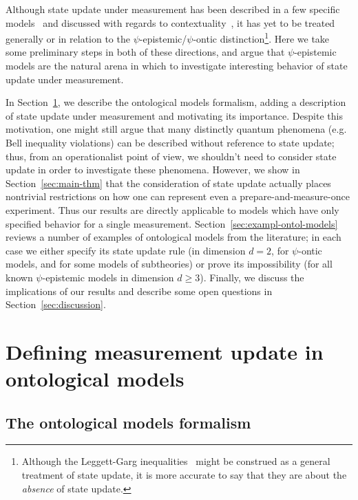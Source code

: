 \documentclass[%
 reprint, onecolumn, 12pt,
superscriptaddress,
nofootinbib,
 prx, 
]{quantumarticle}
\begin{document}
Although state update under measurement has been described in a few
specific
models~\cite{MontinaDynamicsqubitclassical2012,Spekkensdefenseepistemicview2007,CataniSpekkenstoymodel2017,LillystoneContextualpsEpistemicModel2019}
and discussed with regards to
contextuality~\cite{KaranjaiContextualityboundsefficiency2018}, it has
yet to be treated generally or in relation to the
$\psi$-epistemic/$\psi$-ontic distinction\footnote{Although the
  Leggett-Garg
  inequalities~\cite{LeggettQuantummechanicsmacroscopic1985,EmaryLeggettGargInequalities2014}
  might be construed as a general treatment of state update, it is
  more accurate to say that they are about the \emph{absence} of state
  update.}. Here we take some preliminary steps in both of these
directions, and argue that $\psi$-epistemic models are the natural
arena in which to investigate interesting behavior of state update
under measurement.


In Section~\ref{sec:defin-meas-update}, we describe the ontological
models formalism, adding a description of state update under
measurement and motivating its importance. Despite this motivation,
one might still argue that many distinctly quantum phenomena
(e.g. Bell inequality violations) can be described without reference
to state update; thus, from an operationalist point of view, we
shouldn't need to consider state update in order to investigate these
phenomena.  However, we show in Section~\ref{sec:main-thm} that the
consideration of state update actually places nontrivial restrictions
on how one can represent even a prepare-and-measure-once
experiment. Thus our results are directly applicable to models which
have only specified behavior for a single
measurement. Section~\ref{sec:exampl-ontol-models} reviews a number of
examples of ontological models from the literature; in each case we
either specify its state update rule (in dimension $d=2$, for
$\psi$-ontic models, and for some models of subtheories) or prove its
impossibility (for all known $\psi$-epistemic models in dimension
$d\geq3$). Finally, we discuss the implications of our results and
describe some open questions in Section~\ref{sec:discussion}.


 
\section{Defining measurement update in ontological models}
\label{sec:defin-meas-update}

\subsection{The ontological models formalism}
\label{sec:ont-models}
\end{document}

